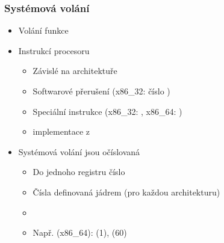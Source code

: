 \begin{frame}
  \frametitle{Systémová volání}

  \begin{itemize}
    \item Volání funkce

    \pause

    \item Instrukcí procesoru
    \begin{itemize}
      \item Závislé na architektuře
      \item Softwarové přerušení (x86\_32: číslo )
      \item Speciální instrukce (x86\_32: ,
        x86\_64: )

      \pause

      \item {} implementace  z 
    \end{itemize}

    \pause

    \item Systémová volání jsou očíslovaná
    \begin{itemize}
      \item Do jednoho registru číslo

      \pause

      \item Čísla  definovaná jádrem (pro každou architekturu)

      \pause

      \item {}
      \item Např. (x86\_64):  (1),  (60)
    \end{itemize}
  \end{itemize}

\end{frame}

